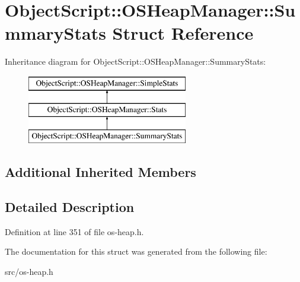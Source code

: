 \hypertarget{struct_object_script_1_1_o_s_heap_manager_1_1_summary_stats}{}\section{Object\+Script\+:\+:O\+S\+Heap\+Manager\+:\+:Summary\+Stats Struct Reference}
\label{struct_object_script_1_1_o_s_heap_manager_1_1_summary_stats}
Inheritance diagram for Object\+Script\+:\+:O\+S\+Heap\+Manager\+:\+:Summary\+Stats\+:\begin{figure}[H]
\begin{center}
\leavevmode
\includegraphics[height=3.000000cm]{struct_object_script_1_1_o_s_heap_manager_1_1_summary_stats}
\end{center}
\end{figure}
\subsection*{Additional Inherited Members}


\subsection{Detailed Description}


Definition at line 351 of file os-\/heap.\+h.



The documentation for this struct was generated from the following file\+:\begin{DoxyCompactItemize}
\item 
src/os-\/heap.\+h\end{DoxyCompactItemize}
